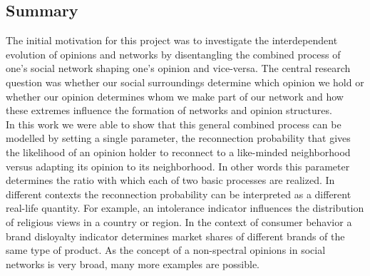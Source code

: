 \documentclass[11pt]{article}
\begin{document}











\subsection{Summary}

The initial motivation for this project was to investigate the interdependent evolution of opinions and networks by disentangling the combined process of one's social network shaping one's opinion and vice-versa. The central research question was whether our social surroundings determine which opinion we hold or whether our opinion determines whom we make part of our network and how these extremes influence the formation of networks and opinion structures.\\


In this work we were able to show that this general combined process can be modelled by setting a single parameter, the reconnection probability that gives the likelihood of an opinion holder to reconnect to a like-minded neighborhood versus adapting its opinion to its neighborhood. In other words this parameter determines the ratio with which each of two basic processes are realized. In different contexts the reconnection probability can be interpreted as a different real-life quantity. For example, an intolerance indicator influences the distribution of religious views in a country or region. In the context of consumer behavior a brand disloyalty indicator determines market shares of different brands of the same type of product. As the concept of a non-spectral opinions in social networks is very broad, many more examples are possible.\\
\end{document}
